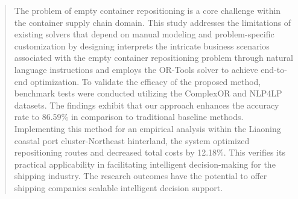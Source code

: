 \documentclass[preprint,12pt]{elsarticle}
\begin{document}
\begin{frontmatter}



\begin{abstract}
The problem of empty container repositioning is a core challenge within the container supply chain domain. This study addresses the limitations of existing solvers that depend on manual modeling and problem-specific customization by designing  interprets the intricate business scenarios associated with the empty container repositioning problem through natural language instructions and employs the OR-Tools solver to achieve end-to-end optimization. To validate the efficacy of the proposed method, benchmark tests were conducted utilizing the ComplexOR and NLP4LP datasets. The findings exhibit that our approach enhances the accuracy rate to 86.59\% in comparison to traditional baseline methods. Implementing this method for an empirical analysis within the Liaoning coastal port cluster-Northeast hinterland, the system optimized repositioning routes and decreased total costs by 12.18\%. This verifies its practical applicability in facilitating intelligent decision-making for the shipping industry. The research outcomes have the potential to offer shipping companies scalable intelligent decision support.
\end{abstract}



\end{frontmatter}
\end{document}
